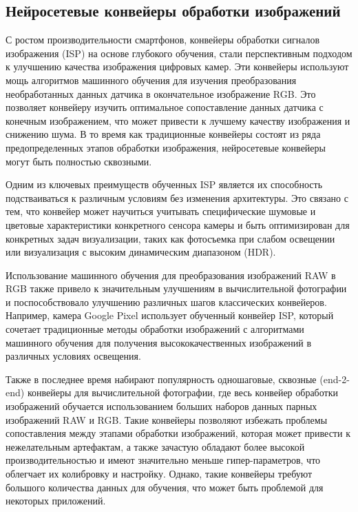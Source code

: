 \subsection{Нейросетевые конвейеры обработки изображений}\label{sect-2-2}

С ростом производительности смартфонов, конвейеры обработки сигналов изображения (ISP) на основе глубокого обучения, стали перспективным подходом к улучшению качества изображения цифровых камер. Эти конвейеры используют мощь алгоритмов машинного обучения для изучения преобразования необработанных данных датчика в окончательное изображение RGB. Это позволяет конвейеру изучить оптимальное сопоставление данных датчика с конечным изображением, что может привести к лучшему качеству изображения и снижению шума. В то время как традиционные конвейеры состоят из ряда предопределенных этапов обработки изображения, нейросетевые конвейеры могут быть полностью сквозными. 

Одним из ключевых преимуществ обученных ISP является их способность подстваиваться к различным условиям без изменения архитектуры. Это связано с тем, что конвейер может научиться учитывать специфические шумовые и цветовые характеристики конкретного сенсора камеры и быть оптимизирован для конкретных задач визуализации, таких как фотосъемка при слабом освещении или визуализация с высоким динамическим диапазоном (HDR).

Использование машинного обучения для преобразования изображений RAW в RGB также привело к значительным улучшениям в вычислительной фотографии и поспособствовало улучшению различных шагов классических конвейеров. Например, камера Google Pixel использует обученный конвейер ISP, который сочетает традиционные методы обработки изображений с алгоритмами машинного обучения для получения высококачественных изображений в различных условиях освещения.

Также в последнее время набирают популярность одношаговые, сквозные (end-2-end) конвейеры для вычислительной фотографии, где весь конвейер обработки изображений обучается использованием больших наборов данных парных изображений RAW и RGB. Такие конвейеры позволяют избежать проблемы сопоставления между этапами обработки изображений, которая может привести к нежелательным артефактам, а также зачастую обладают более высокой производительностью и имеют значительно меньше гипер-параметров, что облегчает их колибровку и настройку. Однако, такие конвейеры требуют большого количества данных для обучения, что может быть проблемой для некоторых приложений.


